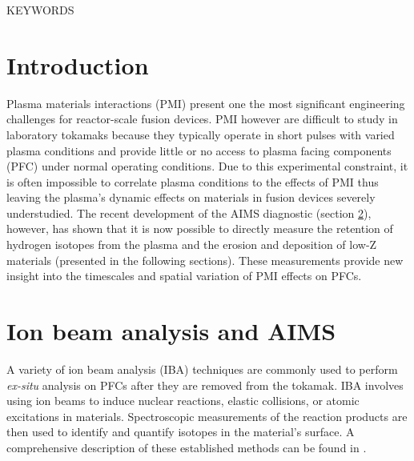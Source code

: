 \documentclass[final,3p,times,twocolumn]{elsarticle}
\begin{document}
\begin{frontmatter}
\begin{keyword}

KEYWORDS
\end{keyword}

\end{frontmatter}


\section{Introduction}
\label{sec:Intro}

Plasma materials interactions (PMI) present one the most significant engineering challenges for reactor-scale fusion devices. PMI however are difficult to study in laboratory tokamaks because they typically operate in short pulses with varied plasma conditions and provide little or no access to plasma facing components (PFC) under normal operating conditions. Due to this experimental constraint, it is often impossible to correlate plasma conditions to the effects of PMI thus leaving the plasma's dynamic effects on materials in fusion devices severely understudied.  The recent development of the AIMS diagnostic \cite{RSIPaper} (section \ref{sec:AIMSOverview}), however, has shown that it is now possible to directly measure the retention of hydrogen isotopes from the plasma \cite{HartwigDRetention} and the erosion and deposition of low-Z materials (presented in the following sections). These measurements provide new insight into the timescales and spatial variation of PMI effects on PFCs. 


\section{Ion beam analysis and AIMS}
\label{sec:AIMSOverview}

A variety of ion beam analysis (IBA) techniques are commonly used to perform \textit{ex-situ} analysis on PFCs after they are removed from the tokamak. IBA involves using ion beams to induce nuclear reactions, elastic collisions, or atomic excitations in materials.  Spectroscopic measurements of the reaction products are then used to identify and quantify isotopes in the material's surface. A comprehensive description of these established methods  can be found in \cite{tesmer1995handbook}.
\end{document}
